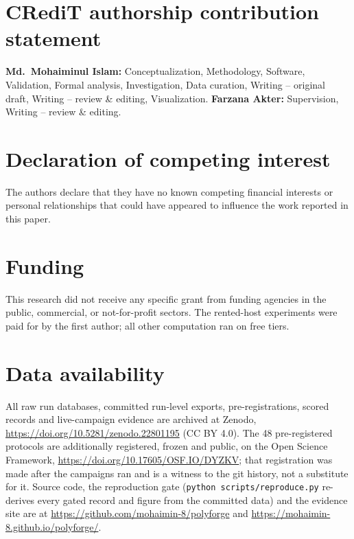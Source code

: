 \documentclass[preprint,review,12pt]{elsarticle}
\renewcommand{\_}{\ifmmode\origunderscore\else\textunderscore\allowbreak\fi}
\begin{document}
\linenumbers












\section*{CRediT authorship contribution statement}
\textbf{Md.\ Mohaiminul Islam:} Conceptualization, Methodology, Software,
Validation, Formal analysis, Investigation, Data curation, Writing -- original
draft, Writing -- review \& editing, Visualization.
\textbf{Farzana Akter:} Supervision, Writing -- review \& editing.

\section*{Declaration of competing interest}
The authors declare that they have no known competing financial interests or
personal relationships that could have appeared to influence the work reported
in this paper.

\section*{Funding}
This research did not receive any specific grant from funding agencies in the
public, commercial, or not-for-profit sectors. The rented-host experiments
were paid for by the first author; all other computation ran on free tiers.

\section*{Data availability}
All raw run databases, committed run-level exports, pre-registrations, scored
records and live-campaign evidence are archived at Zenodo,
\url{https://doi.org/10.5281/zenodo.22801195} (CC BY 4.0). The 48
pre-registered protocols are additionally registered, frozen and public, on
the Open Science Framework, \url{https://doi.org/10.17605/OSF.IO/DYZKV}; that
registration was made after the campaigns ran and is a witness to the git
history, not a substitute for it. Source code, the reproduction gate
(\texttt{python scripts/reproduce.py} re-derives every gated record and
figure from the committed data) and the evidence site are at
\url{https://github.com/mohaimin-8/polyforge} and
\url{https://mohaimin-8.github.io/polyforge/}.
\end{document}
